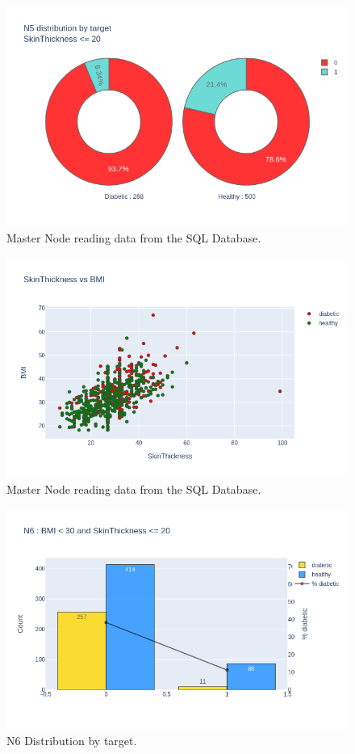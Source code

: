 \documentclass[12pt]{article}
\begin{document}
\begin{figure}[ht]
\centering
\includegraphics[width=1\textwidth]{newplot(24).png}
\caption{Master Node reading data from the SQL Database.}
\end{figure}

\begin{figure}[ht]
\centering
\includegraphics[width=1\textwidth]{newplot(25).png}
\caption{Master Node reading data from the SQL Database.}
\end{figure}

\begin{figure}[ht]
\centering
\includegraphics[width=1\textwidth]{newplot(26).png}
\caption{N6 Distribution by target.}
\end{figure}
\end{document}
